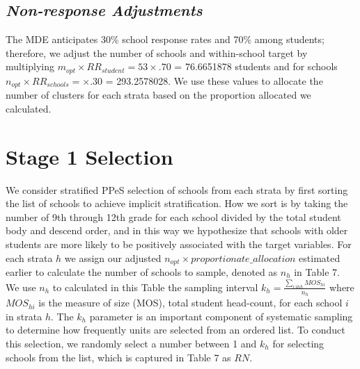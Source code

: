 \documentclass[
  12pt]{article}
\begin{document}
\subsection{\texorpdfstring{\emph{Non-response
Adjustments}}{Non-response Adjustments}}\label{non-response-adjustments}

The MDE anticipates 30\% school response rates and 70\% among students;
therefore, we adjust the number of schools and within-school target by
multiplying \(m_{opt} \times RR_{student} = 53 \times .70\) = 76.6651878
students and for schools \(n_{opt} \times RR_{schools} =  \times .30\) =
293.2578028. We use these values to allocate the number of clusters for
each strata based on the proportion allocated we calculated.

\section{Stage 1 Selection}\label{stage-1-selection}

We consider stratified PPeS selection of schools from each strata by
first sorting the list of schools to achieve implicit stratification.
How we sort is by taking the number of 9th through 12th grade for each
school divided by the total student body and descend order, and in this
way we hypothesize that schools with older students are more likely to
be positively associated with the target variables. For each strata
\(h\) we assign our adjusted
\(n_{opt} \times proportionate \_ allocation\) estimated earlier to
calculate the number of schools to sample, denoted as \(n_h\) in Table
7. We use \(n_h\) to calculated in this Table the sampling interval
\(k_h = \frac{\sum_{i \ in h} MOS_{hi}}{n_h}\) where \(MOS_{hi}\) is the
measure of size (MOS), total student head-count, for each school \(i\)
in strata \(h\). The \(k_h\) parameter is an important component of
systematic sampling to determine how frequently units are selected from
an ordered list. To conduct this selection, we randomly select a number
between 1 and \(k_h\) for selecting schools from the list, which is
captured in Table 7 as \(RN\).
\end{document}
